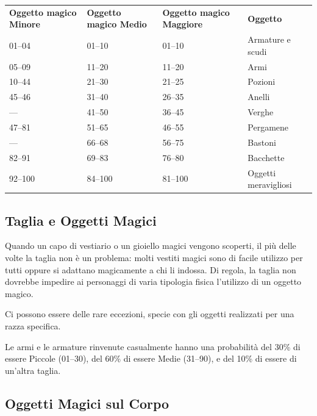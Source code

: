 \documentclass[a4paper,11pt,twoside,openany]{book}
\begin{document}
\label{tabella-generazione-casuale-degli-oggetti-magici}

\begin{tabular}{L{4cm} L{4cm}L{4cm}L{4cm}}
	\toprule
	\textbf{Oggetto magico Minore} & \textbf{ Oggetto magico Medio} & \textbf{Oggetto magico Maggiore} & \textbf{Oggetto}    \\
	01--04         & 01--10         & 01--10           & Armature e scudi\\
	05--09         & 11--20         & 11--20           & Armi\\
	10--44         & 21--30         & 21--25           & Pozioni\\
	45--46         & 31--40         & 26--35           & Anelli\\
	---            & 41--50         & 36--45           & Verghe\\
	47--81         & 51--65         & 46--55           & Pergamene\\
	---            & 66--68         & 56--75           & Bastoni\\
	82--91         & 69--83         & 76--80           & Bacchette\\
	92--100        & 84--100        & 81--100          & Oggetti meravigliosi\\
\end{tabular}


\subsection{Taglia e Oggetti Magici}

\label{taglia-e-oggetti-magici}

Quando un capo di vestiario o un gioiello magici vengono scoperti, il più delle volte la taglia non è un problema: molti vestiti magici sono di facile utilizzo per tutti oppure si adattano magicamente a chi li indossa. Di regola, la taglia non dovrebbe impedire ai personaggi di varia tipologia fisica l'utilizzo di un oggetto magico.

Ci possono essere delle rare eccezioni, specie con gli oggetti realizzati per una razza specifica.

Le armi e le armature rinvenute casualmente hanno una probabilità del 30\% di essere Piccole (01--30), del 60\% di essere Medie (31--90), e del 10\% di essere di un'altra taglia.

\subsection{Oggetti Magici sul Corpo}
\end{document}
